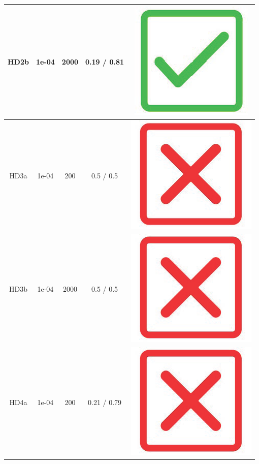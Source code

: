 \begin{table}[!h]
{\begin{tabular}[t]{ccccc}
\midrule
HD2b & 1e-04 & 2000 & 0.19 / 0.81 & \includegraphics[scale=0.05]{figures/green_tick.png}\\
\midrule
HD3a & 1e-04 & 200 & 0.5 / 0.5 & \includegraphics[scale=0.05]{figures/red_cross.png}\\
\midrule
\addlinespace
HD3b & 1e-04 & 2000 & 0.5 / 0.5 & \includegraphics[scale=0.05]{figures/red_cross.png}\\
\midrule
HD4a & 1e-04 & 200 & 0.21 / 0.79 & \includegraphics[scale=0.05]{figures/red_cross.png}\\

\end{tabular}}
\end{table}
